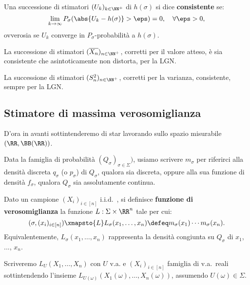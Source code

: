 \begin{multicols*}{2}
\begin{definition}
    Una successione di stimatori $(U_k)_{k \in \NN^+}$ di $h(\sigma)$ si dice
    \textbf{consistente} se:
    \[
        \lim_{k \to \infty} P_\sigma(\abs{U_k - h(\sigma)} > \eps) = 0, \quad \forall \eps > 0,
    \]
    ovverosia se $U_k$ converge in $P_\sigma$-probabilità a $h(\sigma)$.
\end{definition}

\begin{remark}
    La successione di stimatori $(\overline{X_n})_{n \in \NN^+}$, corretti per
    il valore atteso, è sia consistente che
    asintoticamente non distorta, per la LGN.
\end{remark}

\begin{remark}
    La successione di stimatori $(S^2_n)_{n \in \NN^+}$, corretti per la
    varianza, consistente, sempre per la LGN.
\end{remark}

\subsection{Stimatore di massima verosomiglianza}

D'ora in avanti sottintenderemo di star lavorando sullo
spazio misurabile $(\RR, \BB(\RR))$.

\begin{notation}
    Data la famiglia di probabilità $(Q_\sigma)_{\sigma \in \Sigma})$, usiamo
    scrivere $m_\sigma$ per riferirci alla densità discreta $q_\sigma$ (o $p_\sigma$)
    di $Q_\sigma$, qualora sia discreta, oppure alla sua funzione di densità
    $f_\sigma$, qualora $Q_\sigma$ sia assolutamente continua.
\end{notation}

\begin{definition}
    Dato un campione $(X_i)_{i \in [n]}$ i.i.d.~, si definisce
    \textbf{funzione di verosomiglianza} la funzione $L : \Sigma \times \RR^n$
    tale per cui:
    \[
        (\sigma, (x_i)_{i \in [n]}) \xmapsto{L} L_\sigma(x_1, \ldots, x_n) \defeq m_\sigma(x_1) \cdots m_\sigma(x_n).
    \]
    Equivalentemente, $L_\sigma(x_1, \ldots, x_n)$ rappresenta la densità congiunta su $Q_\sigma$
    di $x_1$, ..., $x_n$.
\end{definition}

\begin{notation}
    Scriveremo $L_U(X_1, \ldots, X_n)$ con $U$ v.a. e
    $(X_i)_{i \in [n]}$ famiglia di v.a.~reali sottintendendo
    l'insieme $L_{U(\omega)}(X_1(\omega), \ldots, X_n(\omega))$,
    assumendo $U(\omega) \in \Sigma$.
\end{notation}


\end{multicols*}
